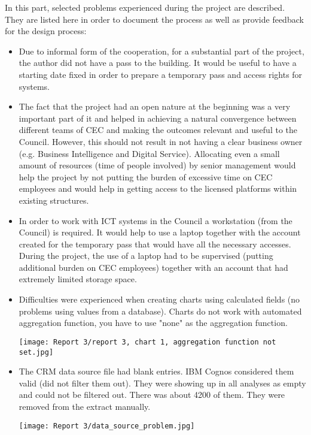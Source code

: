 In this part, selected problems experienced during the project are described. They are listed here in order to document the process as well as provide feedback for the design process:
\begin{itemize}
\item Due to informal form of the cooperation, for a substantial part of the project, the author did not have a pass to the building. It would be useful to have a starting date fixed in order to prepare a temporary pass and access rights for systems.
\item The fact that the project had an open nature at the beginning was a very important part of it and helped in achieving a natural convergence between different teams of CEC and making the outcomes relevant and useful to the Council. However, this should not result in not having a clear business owner (e.g. Business Intelligence and Digital Service). Allocating even a small amount of resources (time of people involved) by senior management would help the project by not putting the burden of excessive time on CEC employees and would help in getting access to the licensed platforms within existing structures.
\item In order to work with ICT systems in the Council a workstation (from the Council) is required. It would help to use a laptop together with the account created for the temporary pass that would have all the necessary accesses. During the project, the use of a laptop had to be supervised (putting additional burden on CEC employees) together with an account that had extremely limited storage space.
\item Difficulties were experienced when creating charts using calculated fields (no problems using values from a database). Charts do not work with automated aggregation function, you have to use "none" as the aggregation function.
\begin{center}
  \texttt{[image: Report 3/report 3, chart 1, aggregation function not set.jpg]}
  \label{normal_case}
\end{center}
\item The CRM data source file had blank entries. IBM Cognos considered them valid (did not filter them out). They were showing up in all analyses as empty and could not be filtered out. There was about 4200 of them. They were removed from the extract manually.
\begin{center}
  \texttt{[image: Report 3/data\_source\_problem.jpg]}

\end{center}
\end{itemize}
